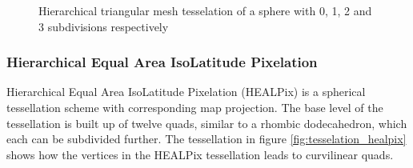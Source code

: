 \begin{figure}
\begin{subfigure}[b]{0.2\textwidth}
    \end{subfigure}
    \caption{Hierarchical triangular mesh tesselation of a sphere with 0, 1, 2 and 3 subdivisions respectively}
    \label{fig:tesselation_htm}
\end{figure}

\subsubsection{Hierarchical Equal Area IsoLatitude Pixelation}

Hierarchical Equal Area IsoLatitude Pixelation (HEALPix) is a spherical tessellation scheme with corresponding map projection. The base level of the tessellation is built up of twelve quads, similar to a rhombic dodecahedron, which each can be subdivided further. The tessellation in figure \ref{fig:tesselation_healpix} shows how the vertices in the HEALPix tessellation leads to curvilinear quads.

